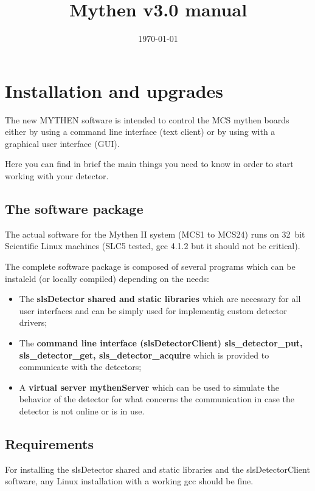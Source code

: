 \documentclass{report}
\begin{document}
\title{Mythen v3.0 manual}
\date{\today}
\maketitle


\chapter{Installation and upgrades}

The new MYTHEN software is intended to control the MCS mythen boards either by using a command line interface (text client) or by using with a graphical user interface (GUI).

Here you can find in brief the main things you need to know in order to start working with your detector. 

\section{The software package}

The actual software for the Mythen II system (MCS1 to MCS24) runs on 32~bit Scientific Linux machines (SLC5 tested, gcc 4.1.2 but it should not be critical). 

The complete software package is composed of several programs which can be instaleld (or locally compiled) depending on the needs:
\begin{itemize}
\item The \textbf{slsDetector shared and static libraries} which are necessary for all user interfaces and can be simply used for implementig custom detector drivers;
\item The \textbf{command line interface (slsDetectorClient) sls\_detector\_put, sls\_detector\_get, sls\_detector\_acquire} which is provided to communicate with the detectors;
\item A \textbf{virtual server mythenServer} which can be used to simulate the behavior of the detector for what concerns the communication in case the detector is not online or is in use.
\end{itemize}



\section{Requirements}

For installing the slsDetector shared and static libraries and the slsDetectorClient software, any Linux installation with a working gcc should be fine.\\
\end{document}
